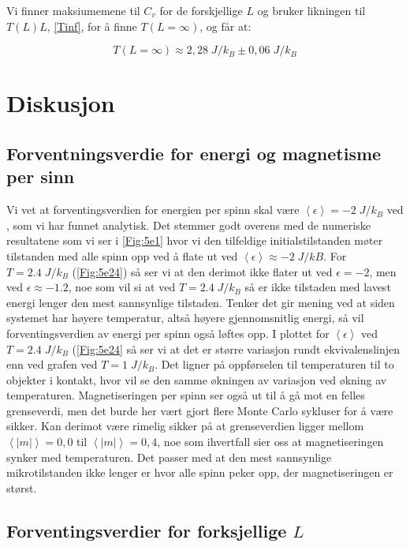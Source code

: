 \documentclass[reprint,english,notitlepage]{revtex4-1}  %
\begin{document}
Vi finner maksiumemene til $C_v$ for de forskjellige $L$ og bruker likningen til $T\left ( L \right ) L$, \eqref{Tinf}, for å finne $T \left ( L = \infty \right )$, og får at:

$$ T \left ( L = \infty \right ) \approx 2,28 \; J/k_B \pm 0,06 \; J/k_B$$   

\section{Diskusjon}



\subsection*{Forventningsverdie for energi og magnetisme per sinn}

Vi vet at forventingsverdien for energien per spinn skal være $\left < \epsilon \right > = -2 \; J/k_B$ ved , som vi har funnet analytisk. Det stemmer godt overens med de numeriske resultatene som vi ser i \autoref{Fig:5e1} hvor vi den tilfeldige initialstilstanden møter tilstanden med alle spinn opp ved å flate ut ved $\left < \epsilon \right > \approx -2 \; J/kB$. For $T = 2.4 \; J/k_B$ (\autoref{Fig:5e24}) så ser vi at den derimot ikke flater ut ved $ \epsilon = -2$, men ved $\epsilon \approx -1.2 $, noe som vil si at ved $T = 2.4 \; J/k_B$ så er ikke tilstaden med lavest energi lenger den mest sannsynlige tilstaden. Tenker det gir mening ved at siden systemet har høyere temperatur, altså høyere gjennomsnitlig energi, så vil forventingsverdien av energi per spinn også løftes opp. I plottet for $\left < \epsilon \right >$ ved $T = 2.4  \; J/k_B$ (\autoref{Fig:5e24} så ser vi at det er større variasjon rundt ekvivalenslinjen enn ved grafen ved $T = 1 \; J/k_B$. Det ligner på oppførselen til temperaturen til to objekter i kontakt, hvor vil se den samme økningen av variasjon ved økning av temperaturen. Magnetiseringen per spinn ser også ut til å gå mot en felles grenseverdi, men det burde her vært gjort flere Monte Carlo sykluser for å være sikker. Kan derimot være rimelig sikker på at grenseverdien ligger mellom $\left < | m | \right > = 0,0$ til $\left < | m | \right > = 0,4$, noe som ihvertfall sier oss at magnetiseringen synker med temperaturen. Det passer med at den mest sannsynlige mikrotilstanden ikke lenger er hvor alle spinn peker opp, der magnetiseringen er størst.

\subsection*{Forventingsverdier for forksjellige $L$}
\end{document}
